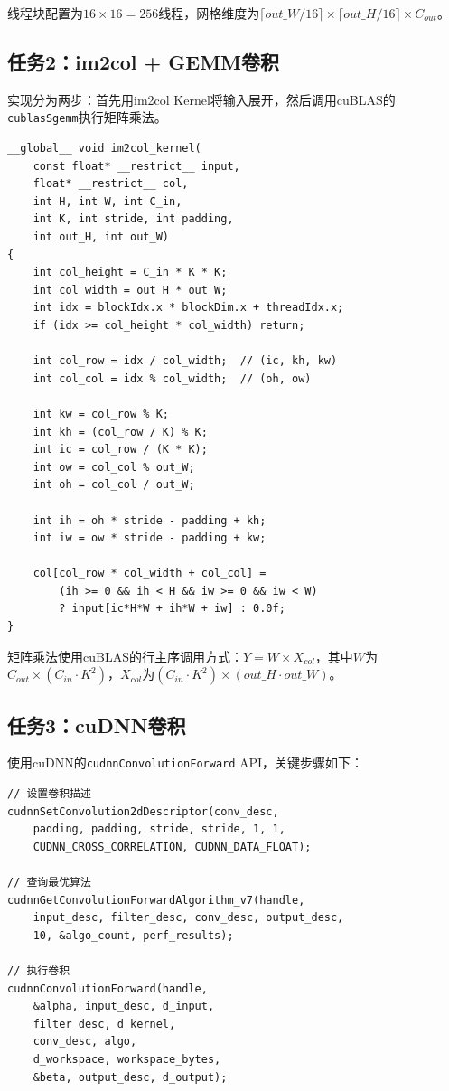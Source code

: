 \documentclass[a4paper]{article}
\begin{document}
线程块配置为$16\times 16 = 256$线程，网格维度为$\lceil out\_W/16\rceil \times \lceil out\_H/16\rceil \times C_{out}$。

\subsection{任务2：im2col + GEMM卷积}

实现分为两步：首先用im2col Kernel将输入展开，然后调用cuBLAS的\texttt{cublasSgemm}执行矩阵乘法。

\begin{lstlisting}[caption={im2col Kernel}]
__global__ void im2col_kernel(
    const float* __restrict__ input,
    float* __restrict__ col,
    int H, int W, int C_in,
    int K, int stride, int padding,
    int out_H, int out_W)
{
    int col_height = C_in * K * K;
    int col_width = out_H * out_W;
    int idx = blockIdx.x * blockDim.x + threadIdx.x;
    if (idx >= col_height * col_width) return;

    int col_row = idx / col_width;  // (ic, kh, kw)
    int col_col = idx % col_width;  // (oh, ow)

    int kw = col_row % K;
    int kh = (col_row / K) % K;
    int ic = col_row / (K * K);
    int ow = col_col % out_W;
    int oh = col_col / out_W;

    int ih = oh * stride - padding + kh;
    int iw = ow * stride - padding + kw;

    col[col_row * col_width + col_col] =
        (ih >= 0 && ih < H && iw >= 0 && iw < W)
        ? input[ic*H*W + ih*W + iw] : 0.0f;
}
\end{lstlisting}

矩阵乘法使用cuBLAS的行主序调用方式：$Y = W \times X_{col}$，其中$W$为$C_{out}\times(C_{in}\cdot K^2)$，$X_{col}$为$(C_{in}\cdot K^2)\times(out\_H\cdot out\_W)$。

\subsection{任务3：cuDNN卷积}

使用cuDNN的\texttt{cudnnConvolutionForward} API，关键步骤如下：

\begin{lstlisting}[caption={cuDNN卷积调用关键步骤}]
// 设置卷积描述
cudnnSetConvolution2dDescriptor(conv_desc,
    padding, padding, stride, stride, 1, 1,
    CUDNN_CROSS_CORRELATION, CUDNN_DATA_FLOAT);

// 查询最优算法
cudnnGetConvolutionForwardAlgorithm_v7(handle,
    input_desc, filter_desc, conv_desc, output_desc,
    10, &algo_count, perf_results);

// 执行卷积
cudnnConvolutionForward(handle,
    &alpha, input_desc, d_input,
    filter_desc, d_kernel,
    conv_desc, algo,
    d_workspace, workspace_bytes,
    &beta, output_desc, d_output);
\end{lstlisting}
\end{document}
